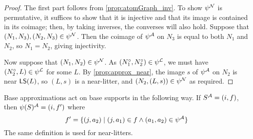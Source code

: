 \begin{proof}
  \leanok
  The first part follows from \cref{prop:atomGraph_inv}.
  To show \( \psi^{\mathcal N} \) is permutative, it suffices to show that it is injective and that its image is contained in its coimage; then, by taking inverses, the converses will also hold.
  Suppose that \( (N_1, N_3), (N_2, N_3) \in \psi^{\mathcal N} \).
  Then the coimage of \( \psi^{\mathcal A} \) on \( N_3 \) is equal to both \( N_1 \) and \( N_2 \), so \( N_1 = N_2 \), giving injectivity.

  Now suppose that \( (N_1, N_2) \in \psi^{\mathcal N} \).
  As \( (N_1^\circ, N_2^\circ) \in \psi^{\mathcal L} \), we must have \( (N_2^\circ, L) \in \psi^{\mathcal L} \) for some \( L \).
  By \cref{prop:approx_near}, the image \( s \) of \( \psi^{\mathcal A} \) on \( N_2 \) is near \( \operatorname{\mathsf{LS}}(L) \), so \( (L, s) \) is a near-litter, and \( (N_2, (L, s)) \in \psi^{\mathcal N} \) as required.
\end{proof}
\begin{definition}
  \label{def:smulApproxSupport}
  Base approximations act on base supports in the following way.
  If \( S^{\mathcal A} = (i, f) \), then \( \psi(S)^{\mathcal A} = (i, f') \) where
  \[ f' = \{ (j, a_2) \mid (j, a_1) \in f \wedge (a_1, a_2) \in \psi^{\mathcal A} \} \]
  The same definition is used for near-litters.
\end{definition}

